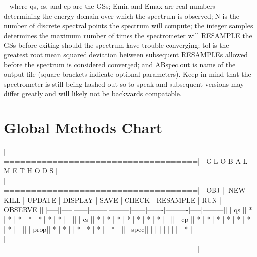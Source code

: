 ~\newline
where \textquotesingle{}qs\textquotesingle{}, \textquotesingle{}cs\textquotesingle{}, and \textquotesingle{}cp\textquotesingle{} are the G\+Ss; \textquotesingle{}Emin\textquotesingle{} and \textquotesingle{}Emax\textquotesingle{} are real numbers determining the energy domain over which the spectrum is observed; \textquotesingle{}N\textquotesingle{} is the number of discrete spectral points the spectrum will compute; the integer \textquotesingle{}samples\textquotesingle{} determines the maximum number of times the spectrometer will R\+E\+S\+A\+M\+P\+LE the G\+Ss before exiting should the spectrum have trouble converging; \textquotesingle{}tol\textquotesingle{} is the greatest root mean squared deviation between subsequent R\+E\+S\+A\+M\+P\+L\+Es allowed before the spectrum is considered converged; and \textquotesingle{}A\+Bspec.\+out\textquotesingle{} is name of the output file (square brackets indicate optional parameters). Keep in mind that the spectrometer is still being hashed out so to speak and subsequent versions may differ greatly and will likely not be backwards compatable.~\newline
\hypertarget{_interface_Global_Methods_Chart}{}\section{Global Methods Chart}\label{_interface_Global_Methods_Chart}
\begin{DoxyVerb}|=================================================================================|
|                           G L O B A L   M E T H O D S                           |
|=================================================================================|
| OBJ || NEW | KILL | UPDATE | DISPLAY | SAVE | CHECK | RESAMPLE | RUN | OBSERVE ||
|-----||-----|------|--------|---------|------|-------|----------|-----|---------||
| qs  ||  *  |  *   |   *    |   *     |  *   |   *   |    *     |     |         ||
| cs  ||  *  |  *   |   *    |   *     |  *   |   *   |    *     |     |         ||
| cp  ||  *  |  *   |   *    |   *     |  *   |   *   |    *     |     |         ||
| prop||  *  |  *   |        |   *     |  *   |   *   |          |  *  |         ||
| spec||     |      |        |         |      |       |          |     |    *    ||
|=================================================================================|
\end{DoxyVerb}
 